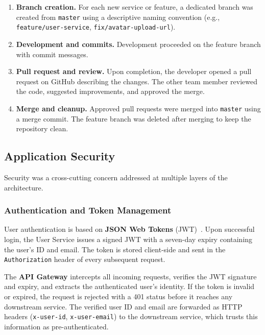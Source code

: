 \begin{enumerate}[nosep]
  \item \textbf{Branch creation.}
        For each new service or feature, a dedicated branch was created from \texttt{master} using a descriptive naming convention (e.g., \texttt{feature/user-service}, \texttt{fix/avatar-upload-url}).

  \item \textbf{Development and commits.}
        Development proceeded on the feature branch with commit messages.

  \item \textbf{Pull request and review.}
        Upon completion, the developer opened a pull request on GitHub describing the changes.
        The other team member reviewed the code, suggested improvements, and approved the merge.

  \item \textbf{Merge and cleanup.}
        Approved pull requests were merged into \texttt{master} using a merge commit.
        The feature branch was deleted after merging to keep the repository clean.
\end{enumerate}



\subsection{Application Security}
\label{sec:security}

Security was a cross-cutting concern addressed at multiple layers of the architecture.

\subsubsection{Authentication and Token Management}

User authentication is based on \textbf{JSON Web Tokens} (JWT)~\cite{jwt2024rfc}.
Upon successful login, the User Service issues a signed JWT with a seven-day expiry containing the user's ID and email.
The token is stored client-side and sent in the \texttt{Authorization} header of every subsequent request.

The \textbf{API Gateway} intercepts all incoming requests, verifies the JWT signature and expiry, and extracts the authenticated user's identity.
If the token is invalid or expired, the request is rejected with a 401 status before it reaches any downstream service.
The verified user ID and email are forwarded as HTTP headers (\texttt{x-user-id}, \texttt{x-user-email}) to the downstream service, which trusts this information as pre-authenticated.

